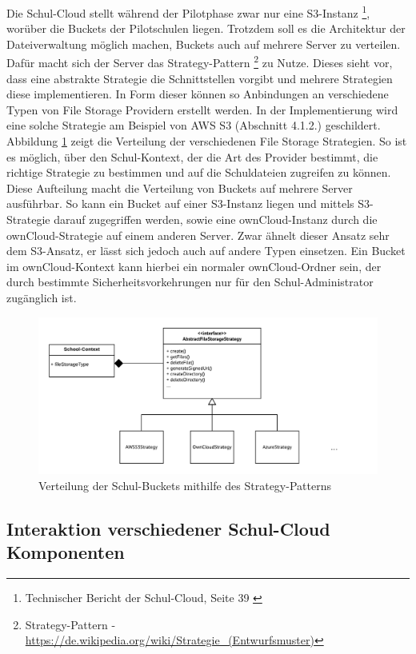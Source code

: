 Die Schul-Cloud stellt während der Pilotphase zwar nur eine S3-Instanz \footnote{Technischer Bericht der Schul-Cloud, Seite 39 \cite{paper:technischerbericht}}, worüber die Buckets der Pilotschulen liegen. Trotzdem soll es die Architektur der Dateiverwaltung möglich machen, Buckets auch auf mehrere Server zu verteilen. Dafür macht sich der Server das Strategy-Pattern \footnote{Strategy-Pattern - \url{https://de.wikipedia.org/wiki/Strategie_(Entwurfsmuster)}} zu Nutze. Dieses sieht vor, dass eine abstrakte Strategie die Schnittstellen vorgibt und mehrere Strategien diese implementieren. In Form dieser können so Anbindungen an verschiedene Typen von File Storage Providern erstellt werden. In der Implementierung wird eine solche Strategie am Beispiel von AWS S3 (Abschnitt 4.1.2.) geschildert. Abbildung \ref{fig:strategy} zeigt die Verteilung der verschiedenen File Storage Strategien. So ist es möglich, über den Schul-Kontext, der die Art des Provider bestimmt, die richtige Strategie zu bestimmen und auf die Schuldateien zugreifen zu können. Diese Aufteilung macht die Verteilung von Buckets auf mehrere Server ausführbar. So kann ein Bucket auf einer S3-Instanz liegen und mittels S3-Strategie darauf zugegriffen werden, sowie eine ownCloud-Instanz durch die ownCloud-Strategie auf einem anderen Server. Zwar ähnelt dieser Ansatz sehr dem S3-Ansatz, er lässt sich jedoch auch auf andere Typen einsetzen. Ein Bucket im ownCloud-Kontext kann hierbei ein normaler ownCloud-Ordner sein, der durch bestimmte Sicherheitsvorkehrungen nur für den Schul-Administrator zugänglich ist.

\begin{figure}[H]
	\centering
	\includegraphics[width=1\linewidth]{images/strategypattern}
	\caption[Caption for concept]{Verteilung der Schul-Buckets mithilfe des Strategy-Patterns}
	\label{fig:strategy}
\end{figure}

\subsection{Interaktion verschiedener Schul-Cloud Komponenten}

